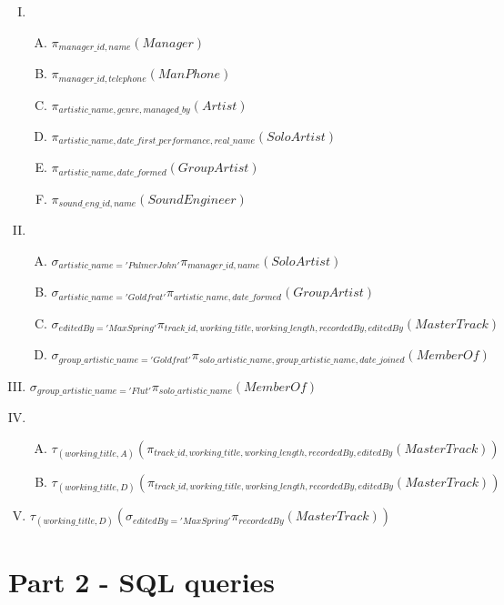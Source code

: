 \documentclass[11pt,a4paper]{article}
\begin{document}
\begin{enumerate}[I.]
\item
  \begin{enumerate}[A. ]
				\item $\pi_{manager\_id,name}(Manager)$
				\item $\pi_{manager\_id,telephone}(ManPhone)$
				\item $\pi_{artistic\_name,genre,managed\_by}(Artist)$
				\item $\pi_{artistic\_name,date\_first\_performance,real\_name}(SoloArtist)$
				\item $\pi_{artistic\_name,date\_formed}(GroupArtist)$
				\item $\pi_{sound\_eng\_id,name}(SoundEngineer)$
  \end{enumerate}
\item
  \begin{enumerate}[A. ]
				\item $\sigma_{artistic\_name='Palmer John'} \pi_{manager\_id,name}(SoloArtist)$
				\item $\sigma_{artistic\_name='Goldfrat'} \pi_{artistic\_name,date\_formed} (GroupArtist)$
				\item $\sigma_{editedBy='Max Spring'} \pi_{track\_id, working\_title,working\_length,recordedBy,editedBy} (MasterTrack)$
				\item $\sigma_{group\_artistic\_name='Goldfrat'} \pi_{solo\_artistic\_name, group\_artistic\_name, date\_joined}(MemberOf)$
  \end{enumerate}
\item $\sigma_{group\_artistic\_name='Flut'} \pi_{solo\_artistic\_name} (MemberOf)$
\item
	\begin{enumerate}[A.]
				\item $\tau_{(working\_title,A)}(\pi_{track\_id, working\_title,working\_length,recordedBy,editedBy}(MasterTrack))$
				\item $\tau_{(working\_title,D)}(\pi_{track\_id, working\_title,working\_length,recordedBy,editedBy}(MasterTrack))$
	\end{enumerate}
\item $\tau_{(working\_title,D)} (\sigma_{editedBy='Max Spring'} \pi_{recordedBy} (MasterTrack))$
\end{enumerate}


\section{Part 2 - SQL queries}
\end{document}

